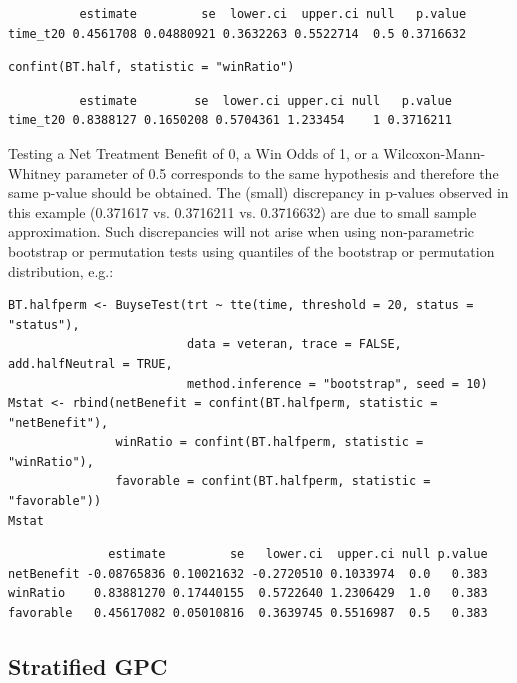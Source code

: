 \documentclass[12pt]{article}
\begin{document}
\begin{verbatim}
          estimate         se  lower.ci  upper.ci null   p.value
time_t20 0.4561708 0.04880921 0.3632263 0.5522714  0.5 0.3716632
\end{verbatim}


\lstset{language=r,label= ,caption= ,captionpos=b,numbers=none}
\begin{lstlisting}
confint(BT.half, statistic = "winRatio")
\end{lstlisting}

\begin{verbatim}
          estimate        se  lower.ci upper.ci null   p.value
time_t20 0.8388127 0.1650208 0.5704361 1.233454    1 0.3716211
\end{verbatim}


Testing a Net Treatment Benefit of 0, a Win Odds of 1, or a
 Wilcoxon-Mann-Whitney parameter of 0.5 corresponds to the same
 hypothesis and therefore the same p-value should be obtained. The
 (small) discrepancy in p-values observed in this example (0.371617
 vs. 0.3716211 vs. 0.3716632) are due to small sample
 approximation. Such discrepancies will not arise when using
 non-parametric bootstrap or permutation tests using quantiles of the
 bootstrap or permutation distribution, e.g.:
\lstset{language=r,label= ,caption= ,captionpos=b,numbers=none}
\begin{lstlisting}
BT.halfperm <- BuyseTest(trt ~ tte(time, threshold = 20, status = "status"),
                         data = veteran, trace = FALSE, add.halfNeutral = TRUE,
                         method.inference = "bootstrap", seed = 10)
Mstat <- rbind(netBenefit = confint(BT.halfperm, statistic = "netBenefit"),
               winRatio = confint(BT.halfperm, statistic = "winRatio"),
               favorable = confint(BT.halfperm, statistic = "favorable"))
Mstat
\end{lstlisting}

\begin{verbatim}
              estimate         se   lower.ci  upper.ci null p.value
netBenefit -0.08765836 0.10021632 -0.2720510 0.1033974  0.0   0.383
winRatio    0.83881270 0.17440155  0.5722640 1.2306429  1.0   0.383
favorable   0.45617082 0.05010816  0.3639745 0.5516987  0.5   0.383
\end{verbatim}


\clearpage

\subsection{Stratified GPC}
\label{sec:org86555a9}
\end{document}
